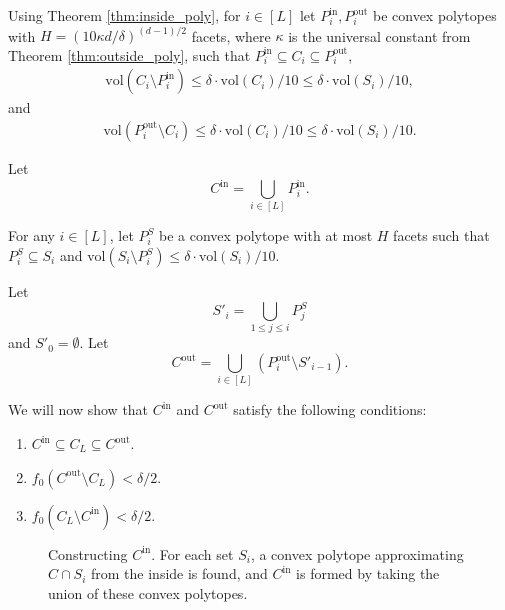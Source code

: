 \documentclass[final,12pt]{colt2018}
\newtheorem{informal theorem}[theorem]{Theorem (informal statement)}
\newcommand{\pini}{P^{\mathrm{in}}_i}
\newcommand{\pouti}{P^{\mathrm{out}}_i}
\newcommand{\cin}{C^\mathrm{in}}
\newcommand{\cout}{C^\mathrm{out}}
\newcommand{\vol}{\mathrm{vol}}
\begin{document}
Using Theorem \ref{thm:inside_poly}, for $i \in [L]$ let $\pini, \pouti$ be convex polytopes with $H = (10 \kappa d / \delta)^{(d-1)/2}$ facets, where $\kappa$ is the universal constant from Theorem \ref{thm:outside_poly}, such that $\pini \subseteq C_i \subseteq \pouti$,
\begin{align}
\vol(C_i \setminus \pini)  \leq \delta \cdot \vol(C_i) / 10 \leq \delta \cdot \vol(S_i) / 10, \label{eq:ci_pini_bound}
\end{align}
and 
\begin{align}
\vol(\pouti \setminus C_i)  \leq \delta \cdot \vol(C_i) / 10 \leq \delta \cdot \vol(S_i) / 10. \label{eq:pouti_ci_bound}
\end{align}

Let 
\[
\cin = \bigcup_{i \in [L]} \pini.
\]



 {For any $i\in [L]$, let $P^S_i$} be a convex polytope with at most $H$ facets such that $P^S_i \subseteq S_i$ and $\vol(S_i \setminus P^S_i) \leq \delta \cdot \vol(S_i)/10$.

Let 
\[
S'_i = \bigcup_{1 \leq j \leq i} P^S_j
\]
and $S'_0 = \emptyset$.
Let 
\[
\cout = \bigcup_{i \in [L]} (\pouti \setminus S'_{i-1}).
\]



We will now show that $\cin$ and $\cout$ satisfy the following conditions:
\begin{enumerate}
\item $\cin \subseteq C_L \subseteq \cout$.
\item $f_0(\cout \setminus C_L) < \delta/2$.
\item $f_0(C_L \setminus \cin) < \delta/2$.
\end{enumerate}

\begin{figure}[t]
\begin{center}
\caption{Constructing $\cin$. For each set $S_i$, a convex polytope approximating $C \cap S_i$ from the inside is found, and $\cin$ is formed by taking the union of these convex polytopes. }
\label{fig:c_in}
\end{center}
\end{figure}
\end{document}
